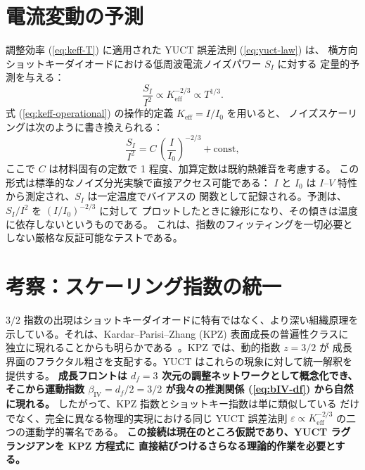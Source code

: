 \documentclass[12pt,a4paper]{article}
\newcommand{\Keff}{K_{\mathrm{eff}}}
\theoremstyle{remark}
\begin{document}
	\section{電流変動の予測}
	\label{sec:predictions}
	調整効率 (\ref{eq:keff-T}) に適用された YUCT 誤差法則 (\ref{eq:yuct-law}) は、
	横方向ショットキーダイオードにおける低周波電流ノイズパワー $S_I$ に対する
	定量的予測を与える：
	\begin{equation}
		\frac{S_I}{I^2} \propto \Keff^{-2/3} \propto T^{1/3}.
		\label{eq:noise-pred}
	\end{equation}
	式 (\ref{eq:keff-operational}) の操作的定義 $\Keff = I/I_0$ を用いると、
	ノイズスケーリングは次のように書き換えられる：
	\begin{equation}
		\frac{S_I}{I^2} = C \, \left(\frac{I}{I_0}\right)^{-2/3} + \text{const},
		\label{eq:noise-operational}
	\end{equation}
	ここで $C$ は材料固有の定数で 1 程度、加算定数は既約熱雑音を考慮する。
	この形式は標準的なノイズ分光実験で直接アクセス可能である：
	$I$ と $I_0$ は $I$--$V$ 特性から測定され、$S_I$ は一定温度でバイアスの
	関数として記録される。予測は、$S_I/I^2$ を $(I/I_0)^{-2/3}$ に対して
	プロットしたときに線形になり、その傾きは温度に依存しないというものである。
	これは、指数のフィッティングを一切必要としない厳格な反証可能なテストである。
	
	\section{考察：スケーリング指数の統一}
	
	$3/2$ 指数の出現はショットキーダイオードに特有ではなく、より深い組織原理を
	示している。それは、Kardar–Parisi–Zhang (KPZ) 表面成長の普遍性クラスに
	独立に現れることからも明らかである~\cite{KPZ}。KPZ では、動的指数 $z = 3/2$ が
	成長界面のフラクタル粗さを支配する。YUCT はこれらの現象に対して統一解釈を提供する。
	\textbf{成長フロントは $d_f = 3$ 次元の調整ネットワークとして概念化でき、
		そこから運動指数 $\beta_{\mathrm{IV}} = d_f/2 = 3/2$ が我々の推測関係 (\ref{eq:bIV-df})
		から自然に現れる。} したがって、KPZ 指数とショットキー指数は単に類似している
	だけでなく、完全に異なる物理的実現における同じ YUCT 誤差法則
	$\varepsilon \propto \Keff^{-2/3}$ の二つの運動学的署名である。
	\textbf{この接続は現在のところ仮説であり、YUCT ラグランジアンを KPZ 方程式に
		直接結びつけるさらなる理論的作業を必要とする。}
	
\end{document}
